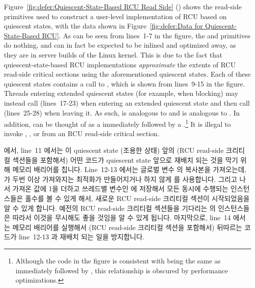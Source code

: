 Figure~\ref{fig:defer:Quiescent-State-Based RCU Read Side}
()
shows the read-side primitives used to construct a user-level
implementation of RCU based on quiescent states, with the data shown in
Figure~\ref{fig:defer:Data for Quiescent-State-Based RCU}.
As can be seen from lines~1-7 in the figure, the 
and  primitives do nothing, and can in fact
be expected to be inlined and optimized away, as they are in
server builds of the Linux kernel.
This is due to the fact that quiescent-state-based RCU implementations
\emph{approximate} the extents of RCU read-side critical sections
using the aforementioned quiescent states.
Each of these quiescent states contains a call to
, which is shown from lines~9-15 in the figure.
Threads entering extended quiescent states (for example, when blocking)
may instead call  (lines~17-23) when entering
an extended quiescent state and then call
 (lines~25-28) when leaving it.
As such,  is analogous to 
and  is analogous to .
In addition,  can be thought of as a
 immediately followed by a
.\footnote{
	Although the code in the figure is consistent with
	being the same as  immediately followed by
	, this relationship is obscured by
	performance optimizations.}
It is illegal to invoke , ,
or  from an RCU read-side critical section.
\fi

 에서, line~11 에서는 이 quiescent state (조용한
상태) 앞의 (RCU read-side 크리티컬 섹션들을 포함해서) 어떤 코드가 quiescent
state 앞으로 재배치 되는 것을 막기 위해 메모리 배리어를 칩니다.
Line~12-13 에서는 글로벌 변수  의 복사본을 가져오는데,
 가 두번 이상 가져와지는 최적화가 만들어지거나 하지 않게
 를 사용합니다. 그리고 나서 가져온 값에 1을 더하고 쓰레드별
변수인  에 저장해서 모든 동시에 수행되는
 인스턴스들은 홀수를 볼 수 있게 해서, 새로운 RCU read-side
크리티컬 섹션이 시작되었음을 알 수 있게 합니다.
예전의 RCU read-side 크리티컬 섹션들을 기다리는  의
인스턴스들은 따라서 이것을 무시해도 좋을 것임을 알 수 있게 됩니다.
마지막으로, line~14 에서는 메모리 배리어를 실행해서 (RCU read-side 크리티컬
섹션을 포함해서) 뒤따르는 코드가 line~12-13 과 재배치 되는 일을 방지합니다.
\iffalse

